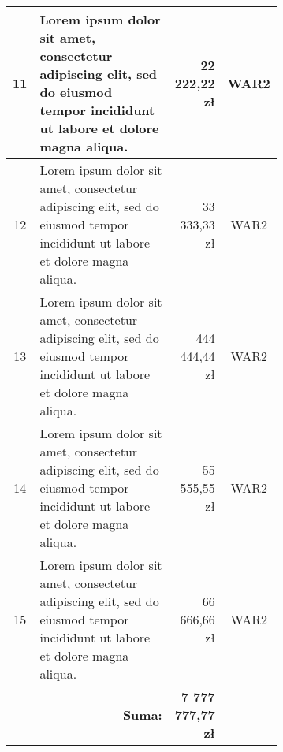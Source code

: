 \begin{longtable}{| c | m{0.58\linewidth} | r | m{0.1\linewidth} |}
	11 & Lorem ipsum dolor sit amet, consectetur adipiscing elit, sed do eiusmod tempor incididunt ut labore et dolore magna aliqua. & 22 222,22 zł & \multicolumn{1}{c|}{WAR2} \\ \hline
	12 & Lorem ipsum dolor sit amet, consectetur adipiscing elit, sed do eiusmod tempor incididunt ut labore et dolore magna aliqua. & 33 333,33 zł & \multicolumn{1}{c|}{WAR2} \\ \hline
	13 & Lorem ipsum dolor sit amet, consectetur adipiscing elit, sed do eiusmod tempor incididunt ut labore et dolore magna aliqua. & 444 444,44 zł & \multicolumn{1}{c|}{WAR2} \\ \hline
	14 & Lorem ipsum dolor sit amet, consectetur adipiscing elit, sed do eiusmod tempor incididunt ut labore et dolore magna aliqua. & 55 555,55 zł & \multicolumn{1}{c|}{WAR2} \\ \hline
	15 & Lorem ipsum dolor sit amet, consectetur adipiscing elit, sed do eiusmod tempor incididunt ut labore et dolore magna aliqua. & 66 666,66 zł & \multicolumn{1}{c|}{WAR2} \\ \hline
	& \multicolumn{1}{r|}{\textbf{Suma:}} & \textbf{7 777 777,77 zł} & 
	\label{table:koszty}
\end{longtable}
\kant[4]

